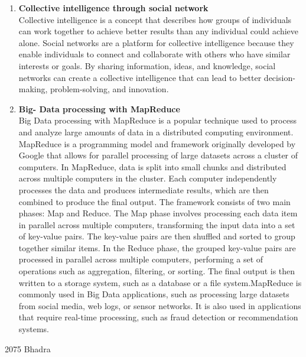 \documentclass[12pt]{article}
\begin{document}
\begin{enumerate}
\begin{enumerate}
        \item {\bfseries Collective intelligence through social network\\}
        Collective intelligence is a concept that describes how groups of individuals can work together to achieve better results than any individual could achieve alone. Social networks are a platform for collective intelligence because they enable individuals to connect and collaborate with others who have similar interests or goals. By sharing information, ideas, and knowledge, social networks can create a collective intelligence that can lead to better decision-making, problem-solving, and innovation.
        \item {\bfseries Big- Data processing with MapReduce\\}
        Big Data processing with MapReduce is a popular technique used to process and analyze large amounts of data in a distributed computing environment. MapReduce is a programming model and framework originally developed by Google that allows for parallel processing of large datasets across a cluster of computers. In MapReduce, data is split into small chunks and distributed across multiple computers in the cluster. Each computer independently processes the data and produces intermediate results, which are then combined to produce the final output. The framework consists of two main phases: Map and Reduce. The Map phase involves processing each data item in parallel across multiple computers, transforming the input data into a set of key-value pairs. The key-value pairs are then shuffled and sorted to group together similar items. In the Reduce phase, the grouped key-value pairs are processed in parallel across multiple computers, performing a set of operations such as aggregation, filtering, or sorting. The final output is then written to a storage system, such as a database or a file system.MapReduce is commonly used in Big Data applications, such as processing large datasets from social media, web logs, or sensor networks. It is also used in applications that require real-time processing, such as fraud detection or recommendation systems.
    \end{enumerate}
\end{enumerate}
\pagebreak
{\Large 2075 Bhadra}
\end{document}
